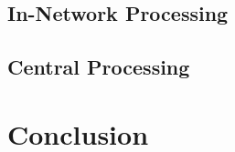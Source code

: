 \subsection{In-Network Processing}

\subsection{Central Processing}

\section{Conclusion}\label{sim:conc}

	



